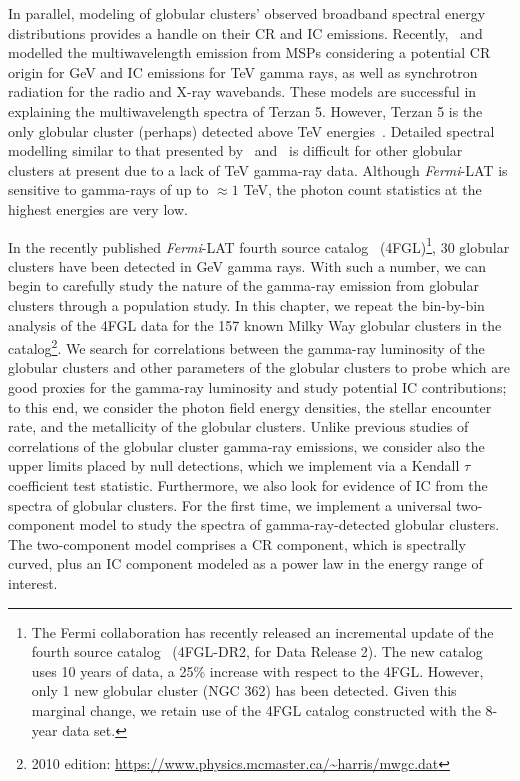 \documentclass[doublespace,nopageskip]{VTthesis}
\begin{document}
In parallel, modeling of globular clusters' observed broadband spectral energy distributions provides a handle on their CR and IC emissions. Recently,~\citet{2013ApJ...779..126K} and~\citet{2019ApJ...880...53N} modelled the multiwavelength emission from MSPs considering a potential CR origin for GeV and IC emissions for TeV gamma rays, as well as synchrotron radiation for the radio and X-ray wavebands. These models are successful in explaining the multiwavelength spectra of Terzan 5. However, Terzan 5 is the only globular cluster (perhaps) detected above TeV energies~\citep{2011A&A...531L..18H}. Detailed spectral modelling similar to that presented by~\citet{2013ApJ...779..126K} and~\citet{2019ApJ...880...53N} is difficult for other globular clusters at present due to a lack of TeV gamma-ray data. Although \textit{Fermi}-LAT is sensitive to gamma-rays of up to $\approx 1$ TeV, the photon count statistics at the highest energies are very low.

In the recently published \textit{Fermi}-LAT fourth source catalog~\citep{2020ApJS..247...33A} (4FGL)\footnote{The Fermi collaboration has recently released an incremental update of the fourth source catalog~\citep{2020arXiv200511208B} (4FGL-DR2, for Data Release 2). The new catalog uses 10 years of data, a 25\% increase with respect to the 4FGL. However, only 1 new globular cluster (NGC 362) has been detected. Given this marginal change, we retain use of the 4FGL catalog constructed with the 8-year data set.}, 30 globular clusters have been detected in GeV gamma rays. With such a number, we can begin to carefully study the nature of the gamma-ray emission from globular clusters through a population study. In this chapter, we repeat the bin-by-bin analysis of the 4FGL data for the 157 known Milky Way globular clusters in the \citet{1996AJ....112.1487H} catalog\footnote{2010  edition: \url{https://www.physics.mcmaster.ca/~harris/mwgc.dat}}. We search for correlations between the gamma-ray luminosity of the globular clusters and other parameters of the globular clusters to probe which are good proxies for the gamma-ray luminosity and study potential IC contributions; to this end, we consider the photon field energy densities, the stellar encounter rate, and the metallicity of the globular clusters. Unlike previous studies of correlations of the globular cluster gamma-ray emissions, we consider also the upper limits placed by null detections, which we implement via a Kendall $\tau$ coefficient test statistic. Furthermore, we also look for evidence of IC from the spectra of globular clusters. For the first time, we implement a universal two-component model to study the spectra of gamma-ray-detected globular clusters. The two-component model comprises a CR component, which is spectrally curved, plus an IC component modeled as a power law in the energy range of interest.
\end{document}
